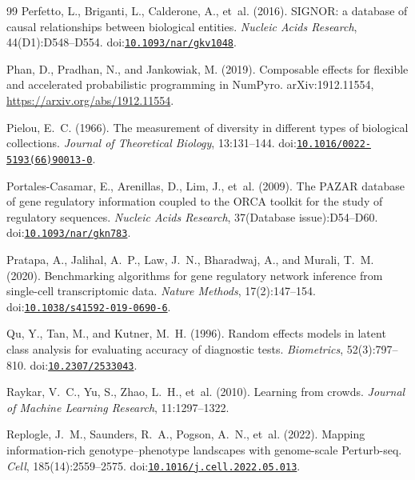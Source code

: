 \begin{thebibliography}{99}
Perfetto, L., Briganti, L., Calderone, A., et~al. (2016).
\newblock SIGNOR: a database of causal relationships between biological entities.
\newblock \emph{Nucleic Acids Research}, 44(D1):D548--D554.
\newblock doi:\href{https://doi.org/10.1093/nar/gkv1048}{\nolinkurl{10.1093/nar/gkv1048}}.

Phan, D., Pradhan, N., and Jankowiak, M. (2019).
\newblock Composable effects for flexible and accelerated probabilistic programming in {NumPyro}.
\newblock arXiv:1912.11554, \url{https://arxiv.org/abs/1912.11554}.

Pielou, E.~C. (1966).
\newblock The measurement of diversity in different types of biological collections.
\newblock \emph{Journal of Theoretical Biology}, 13:131--144.
\newblock doi:\href{https://doi.org/10.1016/0022-5193(66)90013-0}{\nolinkurl{10.1016/0022-5193(66)90013-0}}.

Portales-Casamar, E., Arenillas, D., Lim, J., et~al. (2009).
\newblock The PAZAR database of gene regulatory information coupled to the ORCA toolkit for the study of regulatory sequences.
\newblock \emph{Nucleic Acids Research}, 37(Database issue):D54--D60.
\newblock doi:\href{https://doi.org/10.1093/nar/gkn783}{\nolinkurl{10.1093/nar/gkn783}}.

Pratapa, A., Jalihal, A.~P., Law, J.~N., Bharadwaj, A., and Murali, T.~M. (2020).
\newblock Benchmarking algorithms for gene regulatory network inference from single-cell transcriptomic data.
\newblock \emph{Nature Methods}, 17(2):147--154.
\newblock doi:\href{https://doi.org/10.1038/s41592-019-0690-6}{\nolinkurl{10.1038/s41592-019-0690-6}}.

Qu, Y., Tan, M., and Kutner, M.~H. (1996).
\newblock Random effects models in latent class analysis for evaluating accuracy of diagnostic tests.
\newblock \emph{Biometrics}, 52(3):797--810.
\newblock doi:\href{https://doi.org/10.2307/2533043}{\nolinkurl{10.2307/2533043}}.

Raykar, V.~C., Yu, S., Zhao, L.~H., et~al. (2010).
\newblock Learning from crowds.
\newblock \emph{Journal of Machine Learning Research}, 11:1297--1322.

Replogle, J.~M., Saunders, R.~A., Pogson, A.~N., et~al. (2022).
\newblock Mapping information-rich genotype--phenotype landscapes with genome-scale {Perturb-seq}.
\newblock \emph{Cell}, 185(14):2559--2575.
\newblock doi:\href{https://doi.org/10.1016/j.cell.2022.05.013}{\nolinkurl{10.1016/j.cell.2022.05.013}}.


\end{thebibliography}
